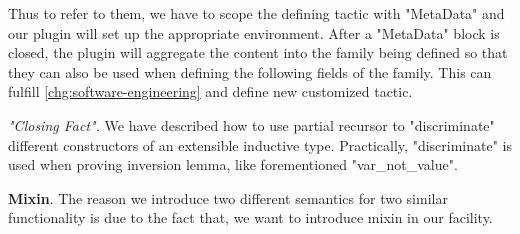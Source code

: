 Thus to refer to them, we have to scope the defining tactic with
"MetaData" and our plugin will set up the appropriate environment. After
a "MetaData" block is closed, the plugin will aggregate the content into
the family being defined so that they can also be used when defining
the following fields of the family.
This can fulfill \ref{chg:software-engineering} and define new customized tactic.


\textit{"Closing Fact".} We have described how to use partial recursor to "discriminate" different constructors of an extensible inductive type. Practically, "discriminate" is used when proving inversion lemma, like forementioned "var_not_value". 





\textbf{Mixin}. The reason we introduce two different semantics for two similar functionality is due to the fact that, we want to introduce mixin in our facility. 

